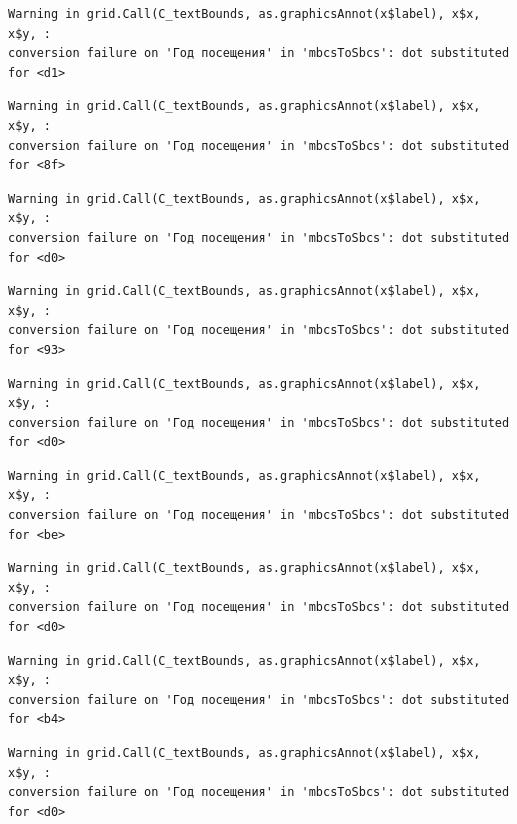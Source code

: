 \documentclass[
  letterpaper,
  DIV=11,
  numbers=noendperiod]{scrartcl}
\begin{document}
\begin{verbatim}
Warning in grid.Call(C_textBounds, as.graphicsAnnot(x$label), x$x, x$y, :
conversion failure on 'Год посещения' in 'mbcsToSbcs': dot substituted for <d1>
\end{verbatim}

\begin{verbatim}
Warning in grid.Call(C_textBounds, as.graphicsAnnot(x$label), x$x, x$y, :
conversion failure on 'Год посещения' in 'mbcsToSbcs': dot substituted for <8f>
\end{verbatim}

\begin{verbatim}
Warning in grid.Call(C_textBounds, as.graphicsAnnot(x$label), x$x, x$y, :
conversion failure on 'Год посещения' in 'mbcsToSbcs': dot substituted for <d0>
\end{verbatim}

\begin{verbatim}
Warning in grid.Call(C_textBounds, as.graphicsAnnot(x$label), x$x, x$y, :
conversion failure on 'Год посещения' in 'mbcsToSbcs': dot substituted for <93>
\end{verbatim}

\begin{verbatim}
Warning in grid.Call(C_textBounds, as.graphicsAnnot(x$label), x$x, x$y, :
conversion failure on 'Год посещения' in 'mbcsToSbcs': dot substituted for <d0>
\end{verbatim}

\begin{verbatim}
Warning in grid.Call(C_textBounds, as.graphicsAnnot(x$label), x$x, x$y, :
conversion failure on 'Год посещения' in 'mbcsToSbcs': dot substituted for <be>
\end{verbatim}

\begin{verbatim}
Warning in grid.Call(C_textBounds, as.graphicsAnnot(x$label), x$x, x$y, :
conversion failure on 'Год посещения' in 'mbcsToSbcs': dot substituted for <d0>
\end{verbatim}

\begin{verbatim}
Warning in grid.Call(C_textBounds, as.graphicsAnnot(x$label), x$x, x$y, :
conversion failure on 'Год посещения' in 'mbcsToSbcs': dot substituted for <b4>
\end{verbatim}

\begin{verbatim}
Warning in grid.Call(C_textBounds, as.graphicsAnnot(x$label), x$x, x$y, :
conversion failure on 'Год посещения' in 'mbcsToSbcs': dot substituted for <d0>
\end{verbatim}
\end{document}

